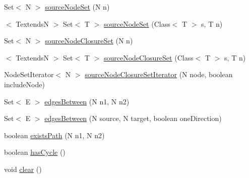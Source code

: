 \begin{DoxyCompactItemize}
\item 
Set$<$ N $>$ \hyperlink{interfaceorg_1_1tzi_1_1use_1_1graph_1_1_directed_graph_3_01_n_00_01_e_01extends_01_directed_edge_3_01_n_01_4_01_4_a0f21c823d6e993dee69d6d09986a2e55}{source\-Node\-Set} (N n)
\item 
$<$ Textends\-N $>$ Set$<$ T $>$ \hyperlink{interfaceorg_1_1tzi_1_1use_1_1graph_1_1_directed_graph_3_01_n_00_01_e_01extends_01_directed_edge_3_01_n_01_4_01_4_a341fb3252bfebe312a0749684461fbdd}{source\-Node\-Set} (Class$<$ T $>$ s, T n)
\item 
Set$<$ N $>$ \hyperlink{interfaceorg_1_1tzi_1_1use_1_1graph_1_1_directed_graph_3_01_n_00_01_e_01extends_01_directed_edge_3_01_n_01_4_01_4_a468b759424361554788ed51cd944bc8b}{source\-Node\-Closure\-Set} (N n)
\item 
$<$ Textends\-N $>$ Set$<$ T $>$ \hyperlink{interfaceorg_1_1tzi_1_1use_1_1graph_1_1_directed_graph_3_01_n_00_01_e_01extends_01_directed_edge_3_01_n_01_4_01_4_aa0f9eb9728952e1b57d30245b0f5c81f}{source\-Node\-Closure\-Set} (Class$<$ T $>$ s, T n)
\item 
Node\-Set\-Iterator$<$ N $>$ \hyperlink{interfaceorg_1_1tzi_1_1use_1_1graph_1_1_directed_graph_3_01_n_00_01_e_01extends_01_directed_edge_3_01_n_01_4_01_4_a1351b4ca87ed9da77d54423c66f55d09}{source\-Node\-Closure\-Set\-Iterator} (N node, boolean include\-Node)
\item 
Set$<$ E $>$ \hyperlink{interfaceorg_1_1tzi_1_1use_1_1graph_1_1_directed_graph_3_01_n_00_01_e_01extends_01_directed_edge_3_01_n_01_4_01_4_a697328bb2bda42990e549b51e86c2c11}{edges\-Between} (N n1, N n2)
\item 
Set$<$ E $>$ \hyperlink{interfaceorg_1_1tzi_1_1use_1_1graph_1_1_directed_graph_3_01_n_00_01_e_01extends_01_directed_edge_3_01_n_01_4_01_4_ac491bc32bece9c2aaed84f94a26559a5}{edges\-Between} (N source, N target, boolean one\-Direction)
\item 
boolean \hyperlink{interfaceorg_1_1tzi_1_1use_1_1graph_1_1_directed_graph_3_01_n_00_01_e_01extends_01_directed_edge_3_01_n_01_4_01_4_a10e44b14d1ee1b5d61bba7d7491f34ad}{exists\-Path} (N n1, N n2)
\item 
boolean \hyperlink{interfaceorg_1_1tzi_1_1use_1_1graph_1_1_directed_graph_3_01_n_00_01_e_01extends_01_directed_edge_3_01_n_01_4_01_4_a2141d4f35fb47d36ba04e4380ec3d7a0}{has\-Cycle} ()
\item 
void \hyperlink{interfaceorg_1_1tzi_1_1use_1_1graph_1_1_directed_graph_3_01_n_00_01_e_01extends_01_directed_edge_3_01_n_01_4_01_4_a568ac60f4af428fcadaa47307a6517df}{clear} ()
\end{DoxyCompactItemize}


